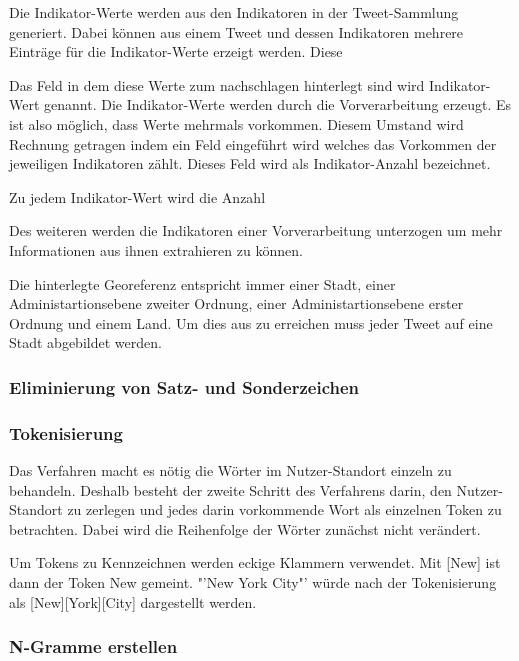 				
				Die Indikator-Werte werden aus den Indikatoren in der Tweet-Sammlung generiert.
				Dabei können aus einem Tweet und dessen Indikatoren mehrere Einträge für die Indikator-Werte erzeigt werden. 
				Diese  

				Das Feld in dem diese Werte zum nachschlagen hinterlegt sind wird Indikator-Wert genannt. 
				Die Indikator-Werte werden durch die Vorverarbeitung erzeugt.   
				Es ist also möglich, dass Werte mehrmals vorkommen. 
				Diesem Umstand wird Rechnung getragen indem ein Feld eingeführt wird welches das Vorkommen der jeweiligen Indikatoren zählt. 
				Dieses Feld wird als Indikator-Anzahl bezeichnet.

				Zu jedem Indikator-Wert wird die Anzahl 

				Des weiteren werden die Indikatoren einer Vorverarbeitung unterzogen um mehr Informationen aus ihnen extrahieren zu können. 

				Die hinterlegte Georeferenz entspricht immer einer Stadt, einer Administartionsebene zweiter Ordnung, einer Administartionsebene erster Ordnung und einem Land. 
				Um dies aus zu erreichen muss jeder Tweet auf eine Stadt abgebildet werden.


		  	\subsubsection{Eliminierung von Satz- und Sonderzeichen}

			  	

			\subsubsection{Tokenisierung}

				Das Verfahren macht es nötig die Wörter im Nutzer-Standort einzeln zu behandeln. 
				Deshalb besteht der zweite Schritt des Verfahrens darin, den Nutzer-Standort zu zerlegen und jedes darin vorkommende Wort als einzelnen Token zu betrachten. 
				Dabei wird die Reihenfolge der Wörter zunächst nicht verändert.

				Um Tokens zu Kennzeichnen werden eckige Klammern verwendet.  
				Mit [New] ist dann der Token New gemeint. 
				"'New York City"' würde nach der Tokenisierung als [New][York][City] dargestellt werden. 


			\subsubsection{N-Gramme erstellen}


